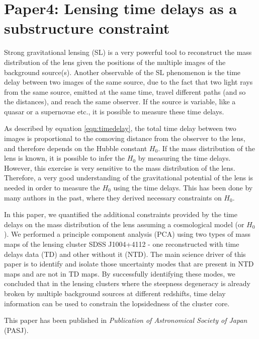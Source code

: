 \chapter{Paper4: Lensing time delays as a substructure constraint}\label{paper:timedelays}

Strong gravitational lensing (SL) is a very powerful tool to reconstruct the mass distribution
of the lens given the positions of the multiple images of the background source(s). 
Another observable
of the SL phenomenon is the time delay between two images of the same source,
due to the fact that two light rays from the same source, emitted at the
same time, travel different paths (and so the distances), and reach the same observer. 
If the source is variable, like a quasar or a supernovae etc., 
it is possible to measure these time delays. 

As described by equation \ref{eqn:timedelay}, 
the total time delay between two images 
is proportional to the comoving distance from the observer to the lens, 
and therefore depends
on the Hubble constant $H_0$. If the mass distribution of the lens
is known, it is possible to infer the $H_0$ by measuring the time delays.
However, this exercise is very sensitive to the mass distribution of the 
lens. Therefore, a very good understanding of the gravitational potential
of the lens is needed in order to measure the $H_0$ using the time delays.
This has been done by many authors in the past, where they derived necessary
constraints on $H_0$.

In this paper, we quantified the additional constraints provided by the time delays
on the mass distribution of the lens assuming a cosmological model (or $H_0$). 
We performed a principle component analysis (PCA)
using two types of mass maps of the lensing cluster SDSS J1004+4112 - one 
reconstructed with time delays data (TD) and other without it (NTD). The main
science driver of this paper is to identify and isolate those 
uncertainty modes that are present in NTD maps and are not in TD maps.
By successfully identifying these modes, we concluded that in the lensing clusters
where the steepness degeneracy is already broken by multiple background sources
at different redshifts, time delay information can be used to constrain
the lopsidedness of the cluster core.


This paper has been published in {\it Publication of Astronomical Society of Japan} (PASJ). 


\clearpage
